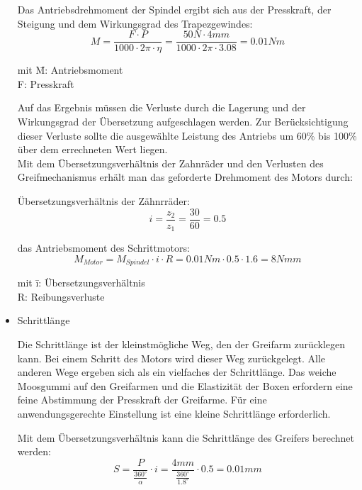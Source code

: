 \begin{itemize}
Das Antriebsdrehmoment der Spindel ergibt sich aus der Presskraft, der Steigung und dem Wirkungsgrad des Trapezgewindes: \\

\[M=\frac{F\cdot P}{1000\cdot 2\pi \cdot \eta}=\frac{50N\cdot 4mm}{1000\cdot 2\pi \cdot 3.08}=0.01Nm\]
\newline

\begin{tabbing}
mit \= M: Antriebsmoment\\
    \> F: Presskraft \\
\end{tabbing}


Auf das Ergebnis müssen die Verluste durch die Lagerung und der Wirkungsgrad der Übersetzung aufgeschlagen werden. Zur Berücksichtigung  dieser Verluste sollte die ausgewählte Leistung des Antriebs um 60\% bis 100\% über dem errechneten Wert liegen.\\

Mit dem Übersetzungsverhältnis der Zahnräder und den Verlusten des Greifmechanismus erhält man das geforderte Drehmoment des Motors durch:

Übersetzungsverhältnis der Zähnrräder:\\
\[i=\frac{z_2}{z_1}=\frac{30}{60}=0.5\]	

das Antriebsmoment des Schrittmotors:\\		
		
\[M_{Motor}=M_{Spindel}\cdot i \cdot R=0.01Nm \cdot 0.5 \cdot 1.6= 8Nmm \]

\begin{tabbing}
mit \= i: Übersetzungsverhältnis\\
    \> R: Reibungsverluste \\
\end{tabbing}






\item Schrittlänge

Die Schrittlänge ist der kleinstmögliche Weg, den der Greifarm zurücklegen kann. Bei einem Schritt des Motors wird dieser Weg zurückgelegt. Alle anderen Wege ergeben sich als ein vielfaches der Schrittlänge. Das weiche Moosgummi auf den Greifarmen und die Elastizität der Boxen erfordern eine feine Abstimmung der Presskraft der Greifarme. Für eine anwendungsgerechte Einstellung ist eine kleine Schrittlänge erforderlich.
\newpage



Mit dem Übersetzungsverhältnis kann die Schrittlänge des Greifers berechnet werden:
\[S=\frac{P}{\frac{360^\circ}{\alpha}}\cdot i=\frac{4mm}{\frac{360^\circ}{1.8^\circ}}\cdot 0.5=0.01mm\]



\end{itemize}

